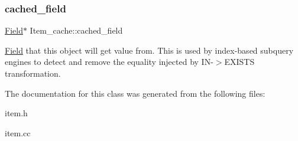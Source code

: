 \subsubsection{\texorpdfstring{cached\+\_\+field}{cached\_field}}
{\footnotesize\ttfamily \mbox{\hyperlink{classField}{Field}}$\ast$ Item\+\_\+cache\+::cached\+\_\+field\hspace{0.3cm}{\ttfamily [protected]}}

\mbox{\hyperlink{classField}{Field}} that this object will get value from. This is used by index-\/based subquery engines to detect and remove the equality injected by IN-\/$>$E\+X\+I\+S\+TS transformation. 

The documentation for this class was generated from the following files\+:\begin{DoxyCompactItemize}
\item 
item.\+h\item 
item.\+cc\end{DoxyCompactItemize}
